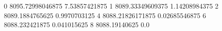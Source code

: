 0 8095.72998046875 7.53857421875
1 8089.33349609375 1.14208984375
2 8089.1884765625 0.9970703125
4 8088.21826171875 0.02685546875
6 8088.232421875 0.041015625
8 8088.19140625 0.0
